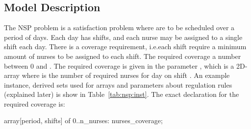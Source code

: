 \documentclass[a4paper,12pt]{article}
\begin{document}
\subsection{Model Description}
The NSP problem is a satisfaction problem where  are to be scheduled over a
period of  days. Each day has  shifts, and each nurse may be
assigned to a single shift each day. There is a coverage requirement, i.e.\@ each shift
require a minimum amount of nurses to be assigned to each shift. The required coverage a number between 0 and
. The required coverage is given in the parameter , which
is a 2D-array where  is the number of required nurses for day
 on shift . An example instance, derived sets used for
arrays and parameters about regulation rules (explained later) is show in
Table~\ref{tab:nsp:inst}. The exact declaration for the required coverage is:
\begin{mznnobreak}
array[period, shifts] of 0..n_nurses: nurses_coverage;
\end{mznnobreak}
\end{document}
